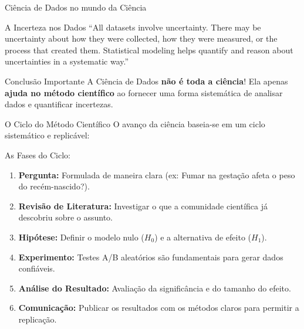 \begin{frame}{Ciência de Dados no mundo da Ciência}
    \begin{block}{A Incerteza nos Dados}
        ``All datasets involve uncertainty. There may be uncertainty about how they were collected, how they were measured, or the process that created them. Statistical modeling helps quantify and reason about uncertainties in a systematic way.''
    \end{block}
    \begin{alertblock}{Conclusão Importante}
        A Ciência de Dados \textbf{não é toda a ciência}! Ela apenas \textbf{ajuda no método científico} ao fornecer uma forma sistemática de analisar dados e quantificar incertezas.
    \end{alertblock}
\end{frame}

\begin{frame}{O Ciclo do Método Científico}
    O avanço da ciência baseia-se em um ciclo sistemático e replicável:
    \begin{block}{As Fases do Ciclo:}
        \begin{enumerate}
            \item \textbf{Pergunta:} Formulada de maneira clara (ex: Fumar na gestação afeta o peso do recém-nascido?).
            \item \textbf{Revisão de Literatura:} Investigar o que a comunidade científica já descobriu sobre o assunto.
            \item \textbf{Hipótese:} Definir o modelo nulo ($H_0$) e a alternativa de efeito ($H_1$).
            \item \textbf{Experimento:} Testes A/B aleatórios são fundamentais para gerar dados confiáveis.
            \item \textbf{Análise do Resultado:} Avaliação da significância e do tamanho do efeito.
            \item \textbf{Comunicação:} Publicar os resultados com os métodos claros para permitir a replicação.
        \end{enumerate}
    \end{block}
\end{frame}

